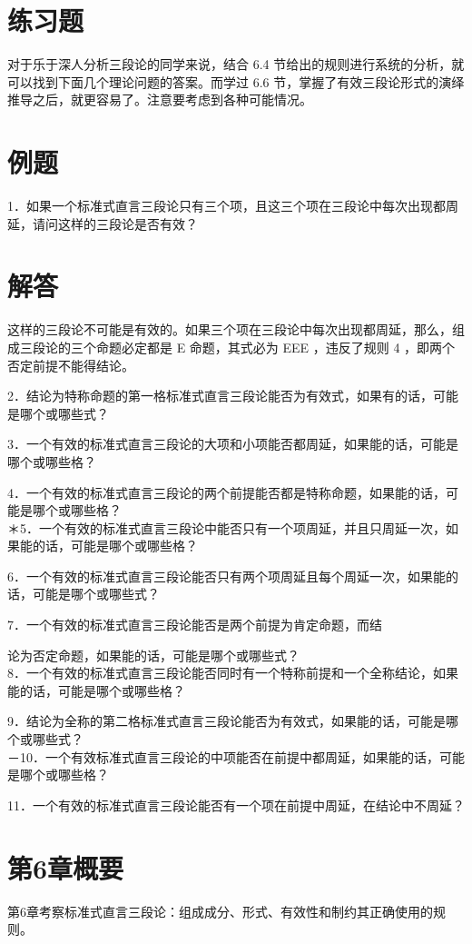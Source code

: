 \section*{练习题}
对于乐于深人分析三段论的同学来说，结合 6.4 节给出的规则进行系统的分析，就可以找到下面几个理论问题的答案。而学过 6.6 节，掌握了有效三段论形式的演绎推导之后，就更容易了。注意要考虑到各种可能情况。

\section*{例题}
1．如果一个标准式直言三段论只有三个项，且这三个项在三段论中每次出现都周延，请问这样的三段论是否有效？

\section*{解答}
这样的三段论不可能是有效的。如果三个项在三段论中每次出现都周延，那么，组成三段论的三个命题必定都是 E 命题，其式必为 EEE ，违反了规则 4 ，即两个否定前提不能得结论。

2．结论为特称命题的第一格标准式直言三段论能否为有效式，如果有的话，可能是哪个或哪些式？

3．一个有效的标准式直言三段论的大项和小项能否都周延，如果能的话，可能是哪个或哪些格？

4．一个有效的标准式直言三段论的两个前提能否都是特称命题，如果能的话，可能是哪个或哪些格？\\
＊5．一个有效的标准式直言三段论中能否只有一个项周延，并且只周延一次，如果能的话，可能是哪个或哪些格？

6．一个有效的标准式直言三段论能否只有两个项周延且每个周延一次，如果能的话，可能是哪个或哪些式？

7．一个有效的标准式直言三段论能否是两个前提为肯定命题，而结

论为否定命题，如果能的话，可能是哪个或哪些式？\\
8．一个有效的标准式直言三段论能否同时有一个特称前提和一个全称结论，如果能的话，可能是哪个或哪些格？

9．结论为全称的第二格标准式直言三段论能否为有效式，如果能的话，可能是哪个或哪些式？\\
－10．一个有效标准式直言三段论的中项能否在前提中都周延，如果能的话，可能是哪个或哪些格？

11．一个有效的标准式直言三段论能否有一个项在前提中周延，在结论中不周延？

\section*{第6章概要}
第6章考察标准式直言三段论：组成成分、形式、有效性和制约其正确使用的规则。

